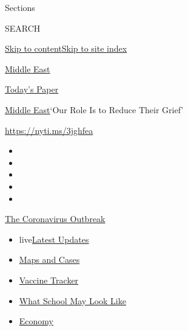 Sections

SEARCH

\protect\hyperlink{site-content}{Skip to
content}\protect\hyperlink{site-index}{Skip to site index}

\href{https://www.nytimes3xbfgragh.onion/section/world/middleeast}{Middle
East}

\href{https://myaccount.nytimes3xbfgragh.onion/auth/login?response_type=cookie\&client_id=vi}{}

\href{https://www.nytimes3xbfgragh.onion/section/todayspaper}{Today's
Paper}

\href{/section/world/middleeast}{Middle East}\textbar{}`Our Role Is to
Reduce Their Grief'

\url{https://nyti.ms/3jghfea}

\begin{itemize}
\item
\item
\item
\item
\item
\end{itemize}

\href{https://www.nytimes3xbfgragh.onion/news-event/coronavirus?action=click\&pgtype=Article\&state=default\&region=TOP_BANNER\&context=storylines_menu}{The
Coronavirus Outbreak}

\begin{itemize}
\tightlist
\item
  live\href{https://www.nytimes3xbfgragh.onion/2020/08/01/world/coronavirus-covid-19.html?action=click\&pgtype=Article\&state=default\&region=TOP_BANNER\&context=storylines_menu}{Latest
  Updates}
\item
  \href{https://www.nytimes3xbfgragh.onion/interactive/2020/us/coronavirus-us-cases.html?action=click\&pgtype=Article\&state=default\&region=TOP_BANNER\&context=storylines_menu}{Maps
  and Cases}
\item
  \href{https://www.nytimes3xbfgragh.onion/interactive/2020/science/coronavirus-vaccine-tracker.html?action=click\&pgtype=Article\&state=default\&region=TOP_BANNER\&context=storylines_menu}{Vaccine
  Tracker}
\item
  \href{https://www.nytimes3xbfgragh.onion/interactive/2020/07/29/us/schools-reopening-coronavirus.html?action=click\&pgtype=Article\&state=default\&region=TOP_BANNER\&context=storylines_menu}{What
  School May Look Like}
\item
  \href{https://www.nytimes3xbfgragh.onion/live/2020/07/31/business/stock-market-today-coronavirus?action=click\&pgtype=Article\&state=default\&region=TOP_BANNER\&context=storylines_menu}{Economy}
\end{itemize}

